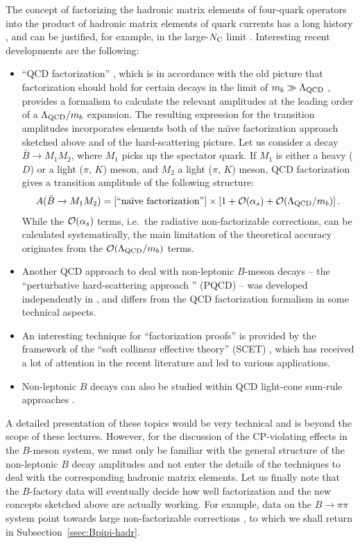 \documentclass[11pt]{cernrep}
\begin{document}
The concept of factorizing the hadronic matrix elements of four-quark 
operators into the product of hadronic matrix elements of quark currents 
has a long history \cite{Neu-Ste}, and can be justified, for example, 
in the large-$N_{\rm C}$ limit \cite{largeN}. Interesting recent 
developments are the following:
\begin{itemize}
\item ``QCD factorization'' \cite{BBNS}, which is in 
accordance with the old picture that factorization should 
hold for certain decays in the limit of $m_b\gg\Lambda_{\rm QCD}$ 
\cite{QCDF-old}, provides a formalism to calculate the 
relevant amplitudes at the leading order of a $\Lambda_{\rm QCD}/m_b$ 
expansion. The resulting expression for the transition amplitudes 
incorporates elements both of the na\"\i ve factorization approach 
sketched above and of the hard-scattering picture. Let us consider a 
decay $\bar B\to M_1M_2$, where $M_1$ picks up the spectator quark. 
If $M_1$ is either a heavy ($D$) or a light ($\pi$, $K$) meson, and 
$M_2$ a light ($\pi$, $K$) meson, QCD factorization gives a transition 
amplitude of the following structure:
\begin{equation}
A(\bar B\to M_1M_2)=\left[\mbox{``na\"\i ve factorization''}\right]
\times\left[1+{\cal O}(\alpha_s)+{\cal O}(\Lambda_{\rm QCD}/m_b)\right].
\end{equation}
While the ${\cal O}(\alpha_s)$ terms, i.e.\ the radiative
non-factorizable corrections, can be calculated systematically, 
the main limitation of the theoretical accuracy originates from 
the ${\cal O}(\Lambda_{\rm QCD}/m_b)$ terms. 

\item Another QCD approach to deal with non-leptonic $B$-meson decays -- 
the ``perturbative hard-scattering approach '' (PQCD) -- was developed 
independently in \cite{PQCD}, and differs from the QCD factorization 
formalism in some technical aspects.

\item An interesting technique for ``factorization proofs'' is provided 
by the framework of the ``soft collinear effective theory'' (SCET) 
\cite{SCET}, which has received a lot of attention in the recent literature 
and led to various applications.

\item Non-leptonic $B$ decays can also be studied within 
QCD light-cone sum-rule approaches \cite{sum-rules}.
\end{itemize}
A detailed presentation of these topics would be very technical and is
beyond the scope of these lectures. However, for the discussion of the
CP-violating effects in the $B$-meson system, we must only be familiar 
with the general structure of the non-leptonic $B$ decay amplitudes and 
not enter the details of the techniques to deal with the
corresponding hadronic matrix elements. Let us finally note that the 
$B$-factory data will eventually decide how well factorization and 
the new concepts sketched above are actually working. For example, 
data on the $B\to\pi\pi$ system point towards 
large non-factorizable corrections \cite{BFRS2,BFRS3}, to which we 
shall return in Subsection~\ref{ssec:Bpipi-hadr}.
\end{document}
